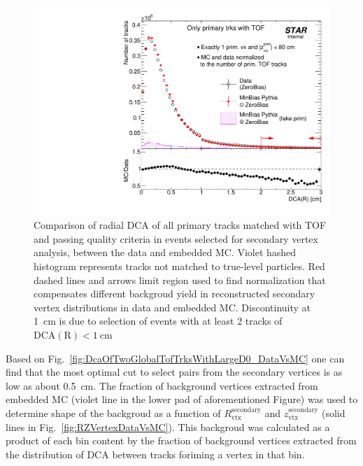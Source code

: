 \begin{figure}[t!]
\begin{minipage}{.4725\textwidth}
  \includegraphics[width=\linewidth]{graphics/deadMaterial/DcaRPrimary_Tof_SelectedEvents_DataVsMC.pdf}\vspace*{-5pt}
  \caption[Comparison of radial DCA of all primary tracks matched with TOF and passing quality criteria in events selected for secondary vertex analysis, between the data and embedded MC.]
   {Comparison of radial DCA of all primary tracks matched with TOF and passing quality criteria in events selected for secondary vertex analysis, between the data and embedded MC. Violet hashed histogram represents tracks not matched to true-level particles. Red dashed lines and arrows limit region used to find normalization that compensates different backgroud yield in reconstructed secondary vertex distributions in data and embedded MC. Discontinuity at 1~cm is due to selection of events with at least 2 tracks of $\text{DCA}(\text{R})<1~\text{cm}$}
   \label{fig:primaryDcaSelectedEvtsDataVsMC}%
\end{minipage}\vspace{-12pt}%
\end{figure}%
%
Based on Fig.~\ref{fig:DcaOfTwoGlobalTofTrksWithLargeD0_DataVsMC} one can find that the most optimal cut to select pairs from the secondary vertices is as low as about 0.5~cm. The fraction of background vertices extracted from embedded MC (violet line in the lower pad of aforementioned Figure) was used to determine shape of the backgroud as a function of $R_{\text{vtx}}^{\text{secondary}}$ and $z_{\text{vtx}}^{\text{secondary}}$ (solid lines in Fig.~\ref{fig:RZVertexDataVsMC}). This backgroud was calculated as a product of each bin content by the fraction of background vertices extracted from the distribution of DCA between tracks foriming a vertex in that bin.

